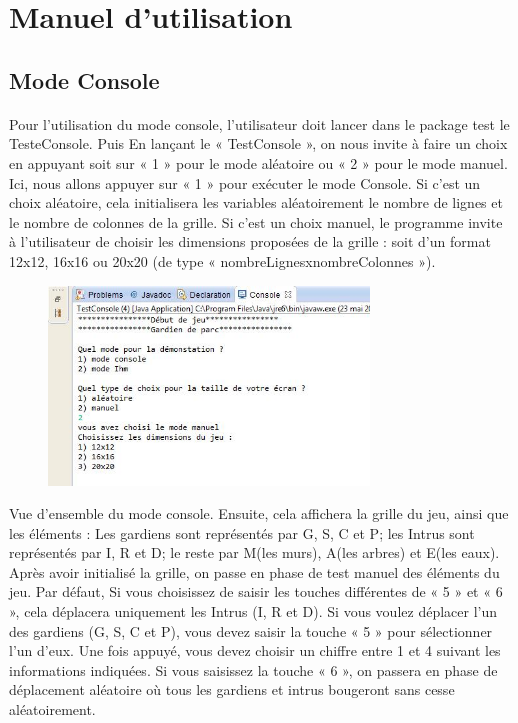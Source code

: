 \usepackage{graphicx}

\section{Manuel d'utilisation}

\subsection{Mode Console}
\vspace{1cm}
\paragraph{}Pour l'utilisation du mode console, l'utilisateur doit lancer dans le package test le TesteConsole. Puis En lançant le « TestConsole », on nous invite à faire un choix en appuyant soit sur « 1 » pour le mode aléatoire ou « 2 » pour le mode manuel. Ici, nous allons appuyer sur « 1 » pour exécuter le mode Console. Si c’est un choix aléatoire, cela initialisera les variables aléatoirement le nombre de lignes et le nombre de colonnes de la grille. Si c’est un choix manuel, le programme invite à l’utilisateur de choisir les dimensions proposées de la grille : soit d’un format 12x12, 16x16 ou 20x20 (de type « nombreLignesxnombreColonnes »). 

\begin{center}
\includegraphics[height=200, width=400]{images/vu_consol.jpg}
\end{center}
\label{}Vue d'ensemble du mode console.
\vspace{1cm}
\paragraphe{}Ensuite, cela affichera la grille du jeu, ainsi que les éléments : Les gardiens sont représentés par G, S, C et P; les Intrus sont représentés par I, R et D; le reste par M(les murs), A(les arbres) et E(les eaux). 
Après avoir initialisé la grille, on passe en phase de test manuel des éléments du jeu. 
Par défaut, Si vous choisissez de saisir les touches différentes de « 5 » et « 6 », cela déplacera uniquement les Intrus (I, R et D). 
Si vous voulez déplacer l’un des gardiens (G, S, C et P), vous devez saisir la touche « 5 » pour sélectionner l’un d’eux. Une fois appuyé, vous devez choisir un chiffre entre 1 et 4 suivant les informations indiquées. Si vous saisissez la touche « 6 », on passera en phase de déplacement aléatoire où tous les gardiens et intrus bougeront sans cesse aléatoirement.

